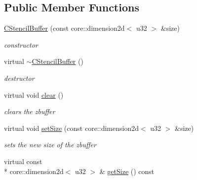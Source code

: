 \subsection*{Public Member Functions}
\begin{DoxyCompactItemize}
\item 
\hypertarget{classirr_1_1video_1_1_c_stencil_buffer_ace6a23f956da2ea3f11e82103a0322f8}{\hyperlink{classirr_1_1video_1_1_c_stencil_buffer_ace6a23f956da2ea3f11e82103a0322f8}{C\-Stencil\-Buffer} (const core\-::dimension2d$<$ u32 $>$ \&size)}\label{classirr_1_1video_1_1_c_stencil_buffer_ace6a23f956da2ea3f11e82103a0322f8}

\begin{DoxyCompactList}\small\item\em constructor \end{DoxyCompactList}\item 
\hypertarget{classirr_1_1video_1_1_c_stencil_buffer_a2d635c67e3f83ddadac5bc7da455345c}{virtual \hyperlink{classirr_1_1video_1_1_c_stencil_buffer_a2d635c67e3f83ddadac5bc7da455345c}{$\sim$\-C\-Stencil\-Buffer} ()}\label{classirr_1_1video_1_1_c_stencil_buffer_a2d635c67e3f83ddadac5bc7da455345c}

\begin{DoxyCompactList}\small\item\em destructor \end{DoxyCompactList}\item 
\hypertarget{classirr_1_1video_1_1_c_stencil_buffer_aaf27fc72611d6b300587c190382f8350}{virtual void \hyperlink{classirr_1_1video_1_1_c_stencil_buffer_aaf27fc72611d6b300587c190382f8350}{clear} ()}\label{classirr_1_1video_1_1_c_stencil_buffer_aaf27fc72611d6b300587c190382f8350}

\begin{DoxyCompactList}\small\item\em clears the zbuffer \end{DoxyCompactList}\item 
\hypertarget{classirr_1_1video_1_1_c_stencil_buffer_ac92c91f6a969e483d220de1768a3fcbc}{virtual void \hyperlink{classirr_1_1video_1_1_c_stencil_buffer_ac92c91f6a969e483d220de1768a3fcbc}{set\-Size} (const core\-::dimension2d$<$ u32 $>$ \&size)}\label{classirr_1_1video_1_1_c_stencil_buffer_ac92c91f6a969e483d220de1768a3fcbc}

\begin{DoxyCompactList}\small\item\em sets the new size of the zbuffer \end{DoxyCompactList}\item 
\hypertarget{classirr_1_1video_1_1_c_stencil_buffer_ad837fd9f1cb18b1f11831bd9defbaeda}{virtual const \\*
core\-::dimension2d$<$ u32 $>$ \& \hyperlink{classirr_1_1video_1_1_c_stencil_buffer_ad837fd9f1cb18b1f11831bd9defbaeda}{get\-Size} () const }\label{classirr_1_1video_1_1_c_stencil_buffer_ad837fd9f1cb18b1f11831bd9defbaeda}


\end{DoxyCompactItemize}

